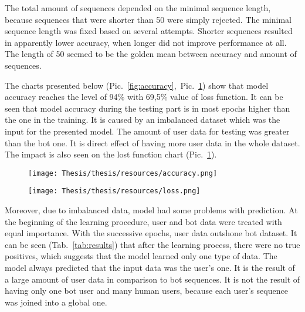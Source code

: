 The total amount of sequences depended on the minimal sequence length, because sequences that were shorter than 50 were simply rejected. The minimal sequence length was fixed based on several attempts. Shorter sequences resulted in apparently lower accuracy, when longer did not improve performance at all. The length of 50 seemed to be the golden mean between accuracy and amount of sequences.\par

The charts presented below \mbox{(Pic. \ref{fig:accuracy}, Pic. \ref{fig:loss})} show that model accuracy reaches the level of 94\% with 69,5\% value of loss function. It can be seen that model accuracy during the testing part is in most epochs higher than the one in the training. It is caused by an imbalanced dataset which was the input for the presented model. The amount of user data for testing was greater than the bot one. It is direct effect of having more user data in the whole dataset. The impact is also seen on the lost function chart \mbox{(Pic. \ref{fig:loss})}.\par

\begin{figure}[!hbt]
\centering
\begin{minipage}{.5\textwidth}
  \centering
  \texttt{[image: Thesis/thesis/resources/accuracy.png]}
  \captionsetup{width=\linewidth}
  \label{fig:accuracy}
\end{minipage}%
\begin{minipage}{.5\textwidth}
  \centering
  \texttt{[image: Thesis/thesis/resources/loss.png]}
  \captionsetup{width=\linewidth}
  \label{fig:loss}
\end{minipage}
\end{figure}

Moreover, due to imbalanced data, model had some problems with prediction. At the beginning of the learning procedure, user and bot data were treated with equal importance. With the successive epochs, user data outshone bot dataset. It can be seen \mbox{(Tab. \ref{tab:results})} that after the learning process, there were no true positives, which suggests that the model learned only one type of data. The model always predicted that the input data was the user's one. It is the result of a large amount of user data in comparison to bot sequences. It is not the result of having only one bot user and many human users, because each user's sequence was joined into a global one.\par